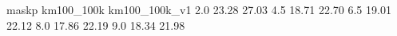 maskp km100_100k km100_100k_v1
2.0 23.28 27.03
4.5 18.71 22.70
6.5 19.01 22.12
8.0 17.86 22.19
9.0 18.34 21.98